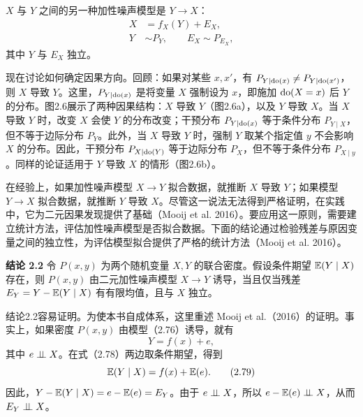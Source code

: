$X$ 与 $Y$ 之间的另一种加性噪声模型是 $Y\to X$：
\begin{equation}
\begin{aligned}
X&=f_X(Y)+E_X,\\
Y&\sim P_Y,\qquad E_X\sim P_{E_X},
\end{aligned}\tag{2.77}
\end{equation}
其中 $Y$ 与 $E_X$ 独立。

现在讨论如何确定因果方向。回顾：如果对某些 $x,x'$，有 $P_{Y\mid\operatorname{do}(x)}\ne P_{Y\mid\operatorname{do}(x')}$，则 $X$ 导致 $Y$。这里，$P_{Y\mid\operatorname{do}(x)}$ 是将变量 $X$ 强制设为 $x$，即施加 $\mathrm{do}(X=x)$ 后 $Y$ 的分布。图2.6展示了两种因果结构：$X$ 导致 $Y$（图2.6a），以及 $Y$ 导致 $X$。当 $X$ 导致 $Y$ 时，改变 $X$ 会使 $Y$ 的分布改变；干预分布 $P_{Y\mid\operatorname{do}(x)}$ 等于条件分布 $P_{Y\mid X}$，但不等于边际分布 $P_Y$。此外，当 $X$ 导致 $Y$ 时，强制 $Y$ 取某个指定值 $y$ 不会影响 $X$ 的分布。因此，干预分布 $P_{X\mid\operatorname{do}(Y)}$ 等于边际分布 $P_X$，但不等于条件分布 $P_{X\mid y}$。同样的论证适用于 $Y$ 导致 $X$ 的情形（图2.6b）。
\begin{figure}[htbp]
\centering
{}
\end{figure}

在经验上，如果加性噪声模型 $X\to Y$ 拟合数据，就推断 $X$ 导致 $Y$；如果模型 $Y\to X$ 拟合数据，就推断 $Y$ 导致 $X$。尽管这一说法无法得到严格证明，在实践中，它为二元因果发现提供了基础（Mooij et al. 2016）。要应用这一原则，需要建立统计方法，评估加性噪声模型是否拟合数据。下面的结论通过检验残差与原因变量之间的独立性，为评估模型拟合提供了严格的统计方法（Mooij et al. 2016）。

\par\medskip\noindent\textbf{结论 2.2}\quad
令 $P(x,y)$ 为两个随机变量 $X,Y$ 的联合密度。假设条件期望 $\mathbb{E}(Y\mid X)$ 存在，则 $P(x,y)$ 由二元加性噪声模型 $X\to Y$ 诱导，当且仅当残差 $E_Y=Y-\mathbb{E}(Y\mid X)$ 有有限均值，且与 $X$ 独立。

结论2.2容易证明。为使本书自成体系，这里重述 Mooij et al.（2016）的证明。事实上，如果密度 $P(x,y)$ 由模型（2.76）诱导，就有
\begin{equation}
Y=f(x)+e,
\tag{2.78}
\end{equation}
其中 $e\mathrel{\perp\!\!\!\perp} X$。在式（2.78）两边取条件期望，得到
\begin{equation}
\mathbb{E}(Y\mid X)=f(x)+\mathbb{E}(e).
\tag{2.79}
\end{equation}
因此，$Y-\mathbb{E}(Y\mid X)=e-\mathbb{E}(e)=E_Y$。由于 $e\mathrel{\perp\!\!\!\perp} X$，所以 $e-\mathbb{E}(e)\mathrel{\perp\!\!\!\perp} X$，从而 $E_Y\mathrel{\perp\!\!\!\perp} X$。

